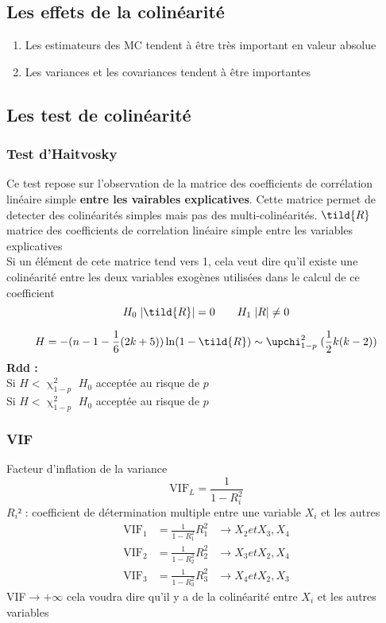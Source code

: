 \documentclass{article}
\begin{document}
\subsection{Les effets de la colinéarité}
\begin{enumerate}
    \item Les estimateurs des MC tendent à être très important en valeur absolue
    \item Les variances et les covariances tendent à être importantes
\end{enumerate}
\subsection{Les test de colinéarité}
\subsubsection{Test d'Haitvosky}
Ce test repose sur l'observation de la matrice des coefficients de corrélation linéaire simple
\textbf{entre les vairables explicatives}. Cette matrice permet de detecter des colinéarités
simples mais pas des multi-colinéarités.
 $\tild{R}$ matrice des coefficients de correlation linéaire simple entre les variables
    explicatives \\
Si un élément de cete matrice tend vers 1, cela veut dire qu'il existe une colinéarité entre
les deux variables exogènes utilisées dans le calcul de ce coefficient
\begin{equation*}
    H_0 \; |\tild{R}| = 0 \qquad H_1 \; |R| \neq 0
\end{equation*}

\begin{equation*}
    \begin{split}
        H = - (n-1-\frac{1}{6}(2k +5))\ln(1-\tild{R}) \sim \upchi^2_{1-p} \; (\frac{1}{2}k(k-2))
    \end{split}
\end{equation*}
\textbf{Rdd :}\\
Si $H< \upchi^2_{1-p}$ $H_0$ acceptée au risque de $p$ \\
Si $H< \upchi^2_{1-p}$ $H_0$ acceptée au risque de $p$

\subsubsection{VIF}
Facteur d'inflation de la variance
\begin{equation*}
    \text{VIF}_L = \frac{1}{1-R_i^2}
\end{equation*}
$R_i²$ : coefficient de détermination multiple entre une variable $X_i$ et les autres
\begin{equation*}
    \begin{split}
        \text{VIF}_1 &= \frac{1}{1-R_1^2} R_1^2 &\rightarrow X_2 et X_3,X_4 \\
        \text{VIF}_2 &= \frac{1}{1-R_2^2} R_2^2 &\rightarrow X_3 et X_2,X_4 \\
        \text{VIF}_3 &= \frac{1}{1-R_3^2} R_3^2 &\rightarrow X_4 et X_2,X_3 
    \end{split}
\end{equation*}
VIF$\rightarrow + \infty$ cela voudra dire qu'il y a de la colinéarité entre $X_i$ et les
autres variables 
\end{document}
